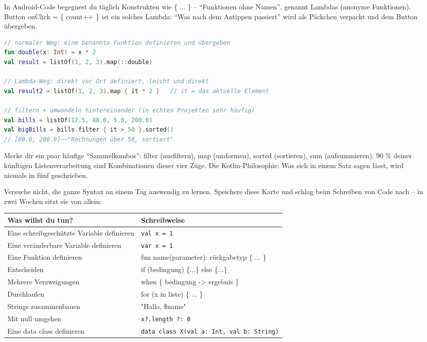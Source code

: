
In Android-Code begegnest du täglich Konstrukten wie \{ ... \} – “Funktionen ohne Namen”, genannt Lambdas (anonyme Funktionen). Button onClick = \{ count++ \} ist ein solches Lambda: “Was nach dem Antippen passiert” wird als Päckchen verpackt und dem Button übergeben.

\begin{lstlisting}[language=Kotlin]
// normaler Weg: eine benannte Funktion definieren und übergeben
fun double(x: Int) = x * 2
val result = listOf(1, 2, 3).map(::double)

// Lambda-Weg: direkt vor Ort definiert, leicht und direkt
val result2 = listOf(1, 2, 3).map { it * 2 }   // it = das aktuelle Element

// filtern + umwandeln hintereinander (in echten Projekten sehr häufig)
val bills = listOf(12.5, 88.0, 5.0, 200.0)
val bigBills = bills.filter { it > 50 }.sorted()
// [88.0, 200.0]——"Rechnungen über 50, sortiert"
\end{lstlisting}

Merke dir ein paar häufige “Sammelkombos”: filter (ausfiltern), map (umformen), sorted (sortieren), sum (aufsummieren). 90 \% deiner künftigen Listenverarbeitung sind Kombinationen dieser vier Züge. Die Kotlin-Philosophie: Was sich in einem Satz sagen lässt, wird niemals in fünf geschrieben.


Versuche nicht, die ganze Syntax an einem Tag auswendig zu lernen. Speichere diese Karte und schlag beim Schreiben von Code nach – in zwei Wochen sitzt sie von allein:

\begin{center}
\begin{tabularx}{\linewidth}{|X|X|}
\hline
\textbf{Was willst du tun?} & \textbf{Schreibweise} \tabularnewline
\hline
Eine schreibgeschützte Variable definieren & \texttt{val x = 1} \tabularnewline
Eine veränderbare Variable definieren & \texttt{var x = 1} \tabularnewline
Eine Funktion definieren & fun name(parameter): rückgabetyp \{ ... \} \tabularnewline
Entscheiden & if (bedingung) \{...\} else \{...\} \tabularnewline
Mehrere Verzweigungen & when \{ bedingung -> ergebnis \} \tabularnewline
Durchlaufen & for (x in liste) \{ ... \} \tabularnewline
Strings zusammenbauen & "Hallo, \$name" \tabularnewline
Mit null umgehen & \texttt{x?.\allowbreak length ?: 0} \tabularnewline
Eine data class definieren & \texttt{data class X(val a: Int, val b: String)} \tabularnewline
\hline
\end{tabularx}
\end{center}

